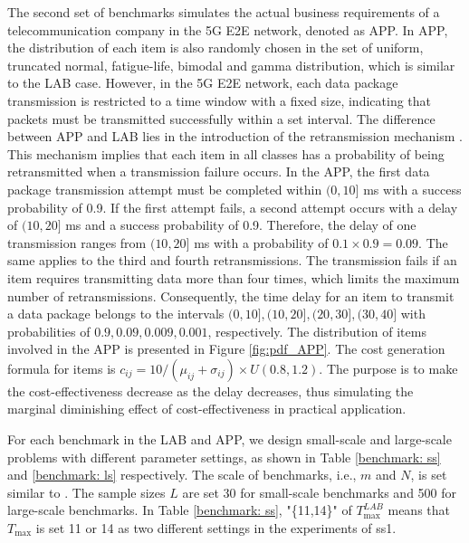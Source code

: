 \documentclass[lettersize,journal]{IEEEtran}
\begin{document}
The second set of benchmarks simulates the actual business requirements of a telecommunication company in the 5G E2E network, denoted as APP. 
In APP, the distribution of each item is also randomly chosen in the set of uniform, truncated normal, fatigue-life, bimodal and gamma distribution, which is similar to the LAB case. 
However, in the 5G E2E network, each data package transmission is restricted to a time window with a fixed size, indicating that packets must be transmitted successfully within a set interval.
The difference between APP and LAB lies in the introduction of the retransmission mechanism \cite{nasrallah2018ultra}. 
This mechanism implies that each item in all classes has a probability of being retransmitted when a transmission failure occurs. 
In the APP, the first data package transmission attempt must be completed within $(0,10]$ ms with a success probability of 0.9. 
If the first attempt fails, a second attempt occurs with a delay of $(10,20]$ ms and a success probability of 0.9. 
Therefore, the delay of one transmission ranges from $(10,20]$ ms with a probability of $0.1\times 0.9 = 0.09$. 
The same applies to the third and fourth retransmissions.
The transmission fails if an item requires transmitting data more than four times, which limits the maximum number of retransmissions. 
Consequently, the time delay for an item to transmit a data package belongs to the intervals $(0,10],(10,20],(20,30],(30,40]$ with probabilities of $0.9,0.09,0.009,0.001$, respectively. 
The distribution of items involved in the APP is presented in Figure \ref{fig:pdf_APP}.
The cost generation formula for items is $c_{ij}=10/(\mu_{ij}+\sigma_{ij} )\times U(0.8,1.2)$. 
The purpose is to make the cost-effectiveness decrease as the delay decreases, thus simulating the marginal diminishing effect of cost-effectiveness in practical application.

For each benchmark in the LAB and APP, we design small-scale and large-scale problems with different parameter settings, as shown in Table \ref{benchmark: ss} and \ref{benchmark: ls} respectively. 
The scale of benchmarks, i.e., $m$ and $N$, is set similar to \cite{mkaouar2020solving}. 
The sample sizes $L$ are set 30 for small-scale benchmarks and 500 for large-scale benchmarks.
In Table \ref{benchmark: ss}, "\{11,14\}" of $T_{\max}^{LAB}$ means that $T_{\max}$ is set 11 or 14 as two different settings in the experiments of ss1. 
\end{document}
